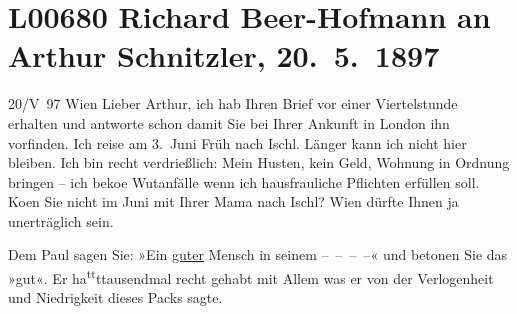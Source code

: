 

\section[Richard Beer-Hofmann an Arthur Schnitzler, 20. 5. 1897]{L00680 Richard Beer-Hofmann an Arthur Schnitzler, 20. 5. 1897}
\nopagebreak{}
\rehead{ }\normalsize\beginnumbering{}
\toendnotes[C]{\smallbreak\pagebreak[2]}
\toendnotes[C]{\smallbreak}
\pstart
           \raggedleft{}{\pb}20/V 97{ }Wien\pend
           \vspace{0.5em}
\pstart
           Lieber Arthur, ich hab Ihren Brief vor einer Viertelstunde erhalten
               und antworte schon damit Sie bei Ihrer Ankunft in London ihn vorfinden. Ich reise am 3. Juni Früh nach Ischl. Länger kann ich nicht hier bleiben. Ich bin
                  {\pb}recht verdrießlich: Mein
               Husten, kein Geld, Wohnung in Ordnung bringen – ich beko{\geminationm}e Wutanfälle wenn ich hausfrauliche Pflichten erfüllen soll. Ko{\geminationm}en Sie nicht {\pb}im Juni mit Ihrer Mama nach Ischl? Wien dürfte Ihnen ja
               unerträglich sein.\pend
           
\pstart
           Dem Paul sagen Sie: »Ein \uline{guter} Mensch in seinem – – – –« und betonen Sie das »gut«. Er ha\substVorne{}\textsuperscript{tt}\substDazwischen{}t\substHinten{}{ }{\pb}tausendmal recht gehabt mit Allem
               was er von der Verlogenheit und Niedrigkeit dieses Packs sagte.\pend
           
